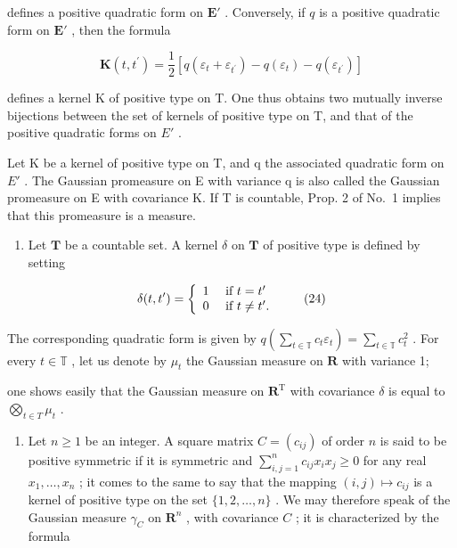 defines a positive quadratic form on \(\mathbf{E}'\) . Conversely, if \(q\) is a positive quadratic form on \(\mathbf{E}'\) , then the formula

\[
\mathbf {K} (t, t ^ {\prime}) = \frac {1}{2} [ q (\varepsilon_ {t} + \varepsilon_ {t ^ {\prime}}) - q (\varepsilon_ {t}) - q (\varepsilon_ {t ^ {\prime}}) ]\tag{23}
\]

defines a kernel K of positive type on T. One thus obtains two mutually inverse bijections between the set of kernels of positive type on T, and that of the positive quadratic forms on \(E'\) .

Let K be a kernel of positive type on T, and q the associated quadratic form on \(E'\) . The Gaussian promeasure on E with variance q is also called the Gaussian promeasure on E with covariance K. If T is countable, Prop. 2 of No.~1 implies that this promeasure is a measure.

\begin{enumerate}
\def\labelenumi{\arabic{enumi})}
\setcounter{enumi}{2}
\tightlist
\item
  Let \(\mathbf{T}\) be a countable set. A kernel \(\delta\) on \(\mathbf{T}\) of positive type is defined by setting
\end{enumerate}

\[
\delta (t, t ^ {\prime}) = \left\{ \begin{array}{l l} 1 & \text { if } t = t ^ {\prime} \\ 0 & \text { if } t \neq t ^ {\prime}. \end{array} \right.\tag{24}
\]

The corresponding quadratic form is given by \(q\left(\sum_{t \in \mathbb{T}} c_t \varepsilon_t\right) = \sum_{t \in \mathbb{T}} c_t^2\) . For every \(t \in \mathbb{T}\) , let us denote by \(\mu_t\) the Gaussian measure on \(\mathbf{R}\) with variance 1;

one shows easily that the Gaussian measure on \(\mathbf{R}^{\mathrm{T}}\) with covariance \(\delta\) is equal to \(\bigotimes_{t\in T}\mu_t\) .

\begin{enumerate}
\def\labelenumi{\arabic{enumi})}
\setcounter{enumi}{3}
\tightlist
\item
  Let \(n \geqslant 1\) be an integer. A square matrix \(C = (c_{ij})\) of order \(n\) is said to be positive symmetric if it is symmetric and \(\sum_{i,j=1}^{n} c_{ij} x_i x_j \geqslant 0\) for any real \(x_1, \ldots, x_n\) ; it comes to the same to say that the mapping \((i,j) \mapsto c_{ij}\) is a kernel of positive type on the set \(\{1,2,\ldots,n\}\) . We may therefore speak of the Gaussian measure \(\gamma_C\) on \(\mathbf{R}^n\) , with covariance \(C\) ; it is characterized by the formula
\end{enumerate}

